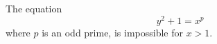 \begin{proposition}
    The equation
\[
    y^2+1=x^p
\]
    where $p$ is an odd prime, is impossible for $x>1$.
\end{proposition}
